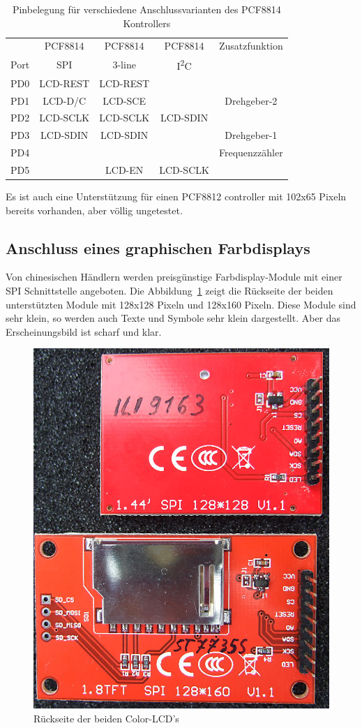 \begin{table}[H]
  \begin{center}
    \begin{tabular}{| c || c | c | c | c |}
    \hline
           &  PCF8814    & PCF8814        & PCF8814     & Zusatzfunktion \\
      Port &    SPI      & 3-line         &   I\textsuperscript{2}C      & \\
    \hline
    \hline
    PD0    &   LCD-REST  & LCD-REST       &            & \\
    \hline
    PD1    &   LCD-D/C   & LCD-SCE        &             & Drehgeber-2 \\
    \hline
    PD2    &   LCD-SCLK  & LCD-SCLK       &  LCD-SDIN   & \\
    \hline
    PD3    &   LCD-SDIN  & LCD-SDIN       &             & Drehgeber-1 \\
    \hline
    PD4    &             &                &             & Frequenzzähler \\
    \hline
    PD5    &             & LCD-EN         &   LCD-SCLK  & \\
    \hline
    \end{tabular}
  \end{center}
  \caption{Pinbelegung für verschiedene Anschlussvarianten des PCF8814 Kontrollers}
\label{tab:PCF8814-con}
\end{table}

Es ist auch eine Unterstützung für einen PCF8812 controller mit 102x65 Pixeln bereits vorhanden,
aber völlig ungetestet.

\subsection{Anschluss eines graphischen Farbdisplays}

Von chinesischen Händlern werden preisgünstige Farbdisplay-Module mit einer SPI Schnittstelle angeboten.
Die Abbildung~\ref{fig:Color_both} zeigt die Rückseite der beiden unterstützten Module mit 128x128 Pixeln
und 128x160 Pixeln.
Diese Module sind sehr klein, so werden auch Texte und Symbole sehr klein dargestellt.
Aber das Erscheinungsbild ist scharf und klar.

\begin{figure}[H]
\centering
\includegraphics[width=.46\textwidth]{../PNG/Color_ILI9163_ST7735.jpg}	%
\caption{Rückseite der beiden Color-LCD's}
\label{fig:Color_both}
\end{figure}

